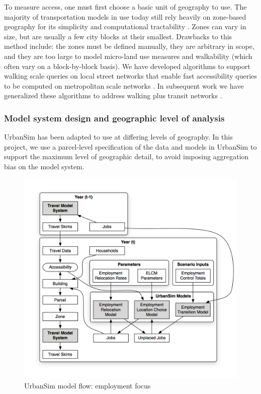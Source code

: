To measure access, one must first choose a basic unit of geography to use.  The majority of transportation models in use today still rely heavily on zone-based geography for its simplicity and computational tractability \citep{hunt_current_2005}.  Zones can vary in size, but are usually a few city blocks at their smallest.  Drawbacks to this method include: the zones must be defined manually, they are arbitrary in scope, and they are too large to model micro-land use measures and walkability (which often vary on a block-by-block basis). We have developed algorithms to support walking scale queries on local street networks that enable fast accessibility queries to be computed on metropolitan scale networks \citep{foti2012generalized}.  In subsequent work we have generalized these algorithms to address walking plus transit networks \citep{blanchard2017urbanaccess, blanchard-waddell-trr-2017}. 


\subsubsection{Model system design and geographic level of analysis}

UrbanSim has been adapted to use at differing levels of geography. In this project, we use a parcel-level specification of the data and models in UrbanSim to support the maximum level of geographic detail, to avoid imposing aggregation bias on the model system. 


\begin{figure}[htbp]
    \center
    \includegraphics[width=\textwidth]{graphics/ParcelEmploymentModel.png}
    \caption{UrbanSim model flow: employment focus}
    \label{fig:employment-models}
\end{figure}

